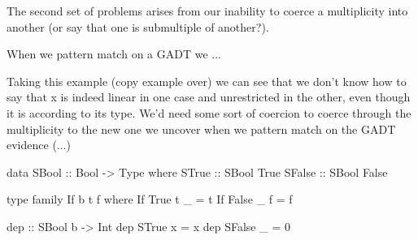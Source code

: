 \documentclass[a4paper, draft]{article}
\begin{document}
The second set of problems arises from our inability to coerce a multiplicity
into another (or say that one is submultiple of another?).

When we pattern match on a GADT we ...

Taking this example (copy example over) we can see that we don't know how to say
that x is indeed linear in one case and unrestricted in the other, even though
it is according to its type. We'd need some sort of coercion to coerce through
the multiplicity to the new one we uncover when we pattern match on the GADT
evidence (...)

\begin{code}
data SBool :: Bool -> Type where
  STrue :: SBool True
  SFalse :: SBool False

type family If b t f where
  If True t _ = t
  If False _ f = f

dep :: SBool b -> Int %
dep STrue x = x
dep SFalse _ = 0
\end{code}
\end{document}
